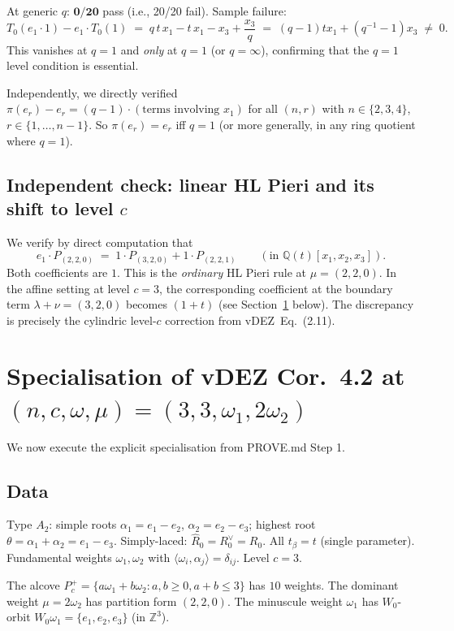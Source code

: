 \documentclass[11pt]{article}
\theoremstyle{definition}
\newcommand{\Z}{\mathbb{Z}}
\newcommand{\Q}{\mathbb{Q}}
\begin{document}
At generic $q$: $\mathbf{0/20}$ pass (i.e., 20/20 fail). Sample failure:
\[
T_0(e_1 \cdot 1) - e_1 \cdot T_0(1) \;=\; q\,t\,x_1 - t\,x_1 - x_3 + \frac{x_3}{q}
\;=\; (q-1)t x_1 + (q^{-1}-1) x_3 \;\ne\; 0.
\]
This vanishes at $q=1$ and \emph{only} at $q=1$ (or $q = \infty$), confirming that
the $q=1$ level condition is essential.

Independently, we directly verified $\pi(e_r) - e_r = (q-1)\cdot(\text{terms involving }x_1)$
for all $(n, r)$ with $n \in \{2,3,4\}$, $r \in \{1, \ldots, n-1\}$. So $\pi(e_r) = e_r$
iff $q=1$ (or more generally, in any ring quotient where $q = 1$).

\subsection{Independent check: linear HL Pieri and its shift to level $c$}
\label{ssec:hl-pieri-comparison}

We verify by direct computation that
\[
e_1 \cdot P_{(2,2,0)} \;=\; 1 \cdot P_{(3,2,0)} + 1 \cdot P_{(2,2,1)}
\qquad (\text{in }\Q(t)[x_1,x_2,x_3]).
\]
Both coefficients are $1$. This is the \emph{ordinary} HL Pieri rule at
$\mu = (2,2,0)$. In the affine setting at level $c = 3$, the corresponding
coefficient at the boundary term $\lambda + \nu = (3,2,0)$ becomes $(1+t)$
(see Section~\ref{sec:specialisation} below). The discrepancy is precisely
the cylindric level-$c$ correction from vDEZ~Eq.~(2.11).

\section{Specialisation of vDEZ Cor.~4.2 at $(n, c, \omega, \mu) = (3, 3, \omega_1, 2\omega_2)$}
\label{sec:specialisation}

We now execute the explicit specialisation from PROVE.md Step 1.

\subsection{Data}
Type $A_2$: simple roots $\alpha_1 = e_1-e_2$, $\alpha_2 = e_2 - e_3$; highest root
$\theta = \alpha_1 + \alpha_2 = e_1 - e_3$. Simply-laced: $\hat R_0 = R_0^\vee = R_0$.
All $t_\beta = t$ (single parameter). Fundamental weights $\omega_1, \omega_2$
with $\langle \omega_i, \alpha_j\rangle = \delta_{ij}$. Level $c = 3$.

The alcove $P_c^+ = \{a\omega_1 + b\omega_2 : a, b \ge 0, a+b \le 3\}$ has $10$
weights. The dominant weight $\mu = 2\omega_2$ has partition form $(2,2,0)$.
The minuscule weight $\omega_1$ has $W_0$-orbit
$W_0 \omega_1 = \{e_1, e_2, e_3\}$ (in $\Z^3$).
\end{document}
